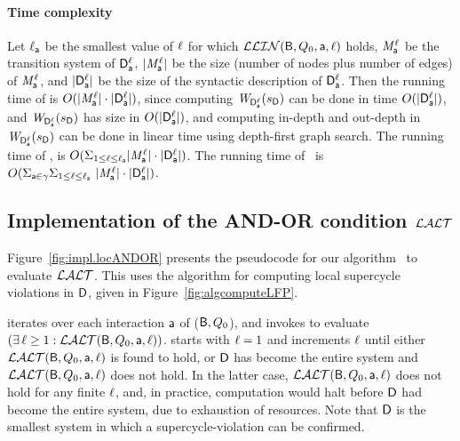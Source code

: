 \paragraph{Time complexity} 
Let 
$\l_\act$ be the smallest value of $\l$ for which $\LLin(\B, Q_0, \act, \l)$ holds, 
$\Mdsk{\act}{\l}$ be the transition system of $\dsks{\act}{\l}$, 
$|\Mdsk{\act}{\l}|$ be the size (number of nodes plus number of edges) of $\Mdsk{\act}{\l}$, and
$|\dsks{\act}{\l}|$ be the size of the syntactic description of $\dsks{\act}{\l}$.
%
Then the running  time of  is $O( |\Mdsk{\act}{\l}| \mult |\dsks{\act}{\l}|)$, since 
computing $\lwfg{\B}{\sD}{\dsks{\act}{\l}}$ can be done in time $O(|\dsks{\act}{\l}|)$, and 
$\lwfg{\B}{\sD}{\dsks{\act}{\l}}$ has size in $O(|\dsks{\act}{\l}|)$, and computing in-depth and out-depth in 
$\lwfg{\B}{\sD}{\dsks{\act}{\l}}$ can be done in linear time using depth-first graph search.
%
The running  time of , is $O( \SUM_{1 \le \l \le \l_\act}   |\Mdsk{\act}{\l}| \mult |\dsks{\act}{\l}|)$.
The running  time of \ is
$O(\SUM_{\act \in \gamma}    \SUM_{1 \le \l \le \l_\act}   \    |\Mdsk{\act}{\l}| \mult |\dsks{\act}{\l}|)$.



 
   \subsection{Implementation of the AND-OR condition $\LAO$}
   \label{s:implANDOR}
%   


Figure~\ref{fig:impl.locANDOR} presents the pseudocode for our algorithm \ to evaluate $\LAO$.  This uses the 
\cLFP{$\dsk{\act}{\l},\sD$} algorithm for computing local supercycle violations in $\dsk{\act}{\l}$, given in Figure~\ref{fig:algcomputeLFP}.

 iterates over each interaction $\act$ of ($\B, Q_0$), and 
invokes  to evaluate $(\ex \l \ge 1: \LAO(\B, Q_0, \act, \l))$.
starts with $\l=1$ and increments $\l$ until either $\LAO(\B, Q_0, \act, \l)$ is found to hold, or
$\dsk{\act}{\l}$ has become the entire system and $\LAO(\B, Q_0, \act, \l)$ does not hold. In the
latter case, $\LAO(\B, Q_0, \act, \l)$ does not hold for any finite $\l$, and, in practice,
computation would halt before $\dsk{\act}{\l}$ had become the entire system, due to exhaustion of
resources.
Note that $\dsk{\act}{1}$ is the smallest system in which a
supercycle-violation can be confirmed. 

